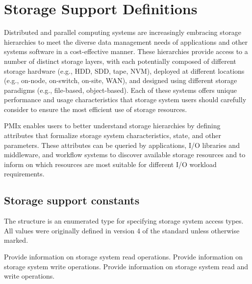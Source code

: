 \chapter{Storage Support Definitions}
\label{chap:api_storage}

Distributed and parallel computing systems are increasingly embracing storage hierarchies to meet the diverse data management needs of applications and other systems software in a cost-effective manner.
These hierarchies provide access to a number of distinct storage layers, with each potentially composed of different storage hardware (e.g., HDD, SDD, tape, NVM), deployed at different locations (e.g., on-node, on-switch, on-site, WAN), and designed using different storage paradigms (e.g., file-based, object-based).
Each of these systems offers unique performance and usage characteristics that storage system users should carefully consider to ensure the most efficient use of storage resources.

PMIx enables users to better understand storage hierarchies by defining attributes that formalize storage system characteristics, state, and other parameters.
These attributes can be queried by applications, I/O libraries and middleware, and workflow systems to discover available storage resources and to inform on which resources are most suitable for different I/O workload requirements.

\section{Storage support constants}


The  structure is an enumerated type for specifying storage system access types.
All values were originally defined in version 4 of the standard unless otherwise marked.

\begin{constantdesc}
%
Provide information on storage system read operations.
%
Provide information on storage system write operations.
%
Provide information on storage system read and write operations.
%
\end{constantdesc}

